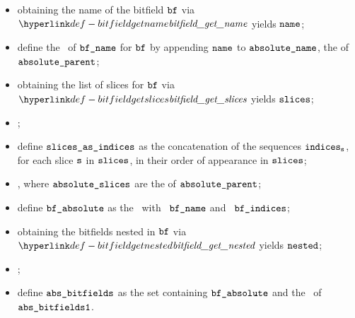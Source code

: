 \ProseParagraph
\AllApply
\begin{itemize}
  \item obtaining the name of the bitfield $\texttt{bf}$ via $\bitfieldgetname$ yields $\texttt{name}$;
  \item define the \absolutename\ of $\texttt{bf\_name}$ for $\texttt{bf}$ by appending $\texttt{name}$ to $\texttt{absolute\_name}$, the \absolutename{} of $\texttt{absolute\_parent}$;
  \item obtaining the list of slices for $\texttt{bf}$ via $\bitfieldgetslices$ yields $\texttt{slices}$;
  \item \Proseslicetoindices{$\tenv$}{$\vs$}{$\indices_\vs$};
  \item define $\vslicesasindices$ as the concatenation of the sequences $\indices_\vs$,
        for each slice $\vs$ in $\texttt{slices}$, in their order of appearance in $\texttt{slices}$;
  \item \Proseselectindicesbyslices{$\vabsslices$}{$\vslicesasindices$}{$\vbfindices$}, where $\vabsslices$ are the \absoluteslices{} of $\texttt{absolute\_parent}$;
  \item define $\vbfabsolute$ as the \absolutebitfield\ with \absolutename\ $\texttt{bf\_name}$
        and \absoluteslices\ $\vbfindices$;
  \item obtaining the bitfields nested in $\texttt{bf}$ via $\bitfieldgetnested$ yields $\vnested$;
  \item \Prosebitfieldstoabsolute{$\tenv$}{$\vnested$}{$\vbfabsolute$}{$\vabsbitfieldsone$};
  \item define $\texttt{abs\_bitfields}$ as the set containing $\vbfabsolute$ and the \absolutebitfields\
        of $\vabsbitfieldsone$.
\end{itemize}

\FormallyParagraph
\begin{mathpar}
\end{mathpar}

